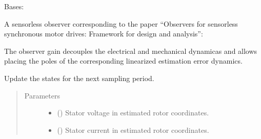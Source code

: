 \documentclass[letterpaper,10pt,english]{sphinxmanual}
\begin{document}

\begin{fulllineitems}
\label{\detokenize{control.sm:control.sm.vector.SensorlessObserver}}
\pysigstartsignatures
{}
\pysigstopsignatures
\sphinxAtStartPar
Bases: 

\sphinxAtStartPar
A sensorless observer corresponding to the paper “Observers for sensorless
synchronous motor drives: Framework for design and analysis”:
\begin{quote}

\sphinxAtStartPar
{}
\end{quote}

\sphinxAtStartPar
The observer gain decouples the electrical and mechanical dynamicas and
allows placing the poles of the corresponding linearized estimation
error dynamics.

\begin{fulllineitems}
\label{\detokenize{control.sm:control.sm.vector.SensorlessObserver.update}}
\pysigstartsignatures
{}
\pysigstopsignatures
\sphinxAtStartPar
Update the states for the next sampling period.
\begin{quote}\begin{description}
\item[{Parameters}] \leavevmode\begin{itemize}
\item {} 
\sphinxAtStartPar
{} () \textendash{} Stator voltage in estimated rotor coordinates.

\item {} 
\sphinxAtStartPar
{} () \textendash{} Stator current in estimated rotor coordinates.

\end{itemize}

\end{description}\end{quote}

\end{fulllineitems}


\end{fulllineitems}
\end{document}
